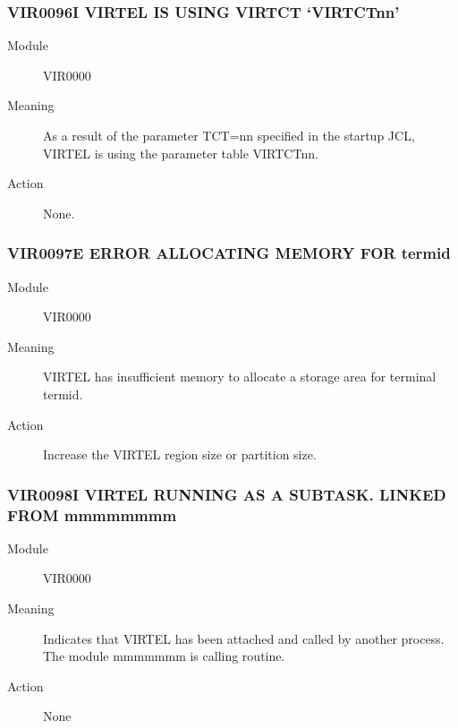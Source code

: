\documentclass[letterpaper,10pt,english]{sphinxmanual}
\begin{document}
\subsubsection{VIR0096I VIRTEL IS USING VIRTCT ‘VIRTCTnn’}
\label{\detokenize{messages:vir0096i-virtel-is-using-virtct-virtctnn}}\begin{description}
\item[{Module}] \leavevmode
VIR0000

\item[{Meaning}] \leavevmode
As a result of the parameter TCT=nn specified in the startup JCL, VIRTEL is using the parameter table VIRTCTnn.

\item[{Action}] \leavevmode
None.

\end{description}


\subsubsection{VIR0097E ERROR ALLOCATING MEMORY FOR termid}
\label{\detokenize{messages:vir0097e-error-allocating-memory-for-termid}}\begin{description}
\item[{Module}] \leavevmode
VIR0000

\item[{Meaning}] \leavevmode
VIRTEL has insufficient memory to allocate a storage area for terminal termid.

\item[{Action}] \leavevmode
Increase the VIRTEL region size or partition size.

\end{description}


\subsubsection{VIR0098I VIRTEL RUNNING AS A SUBTASK. LINKED FROM mmmmmmmm}
\label{\detokenize{messages:vir0098i-virtel-running-as-a-subtask-linked-from-mmmmmmmm}}\begin{description}
\item[{Module}] \leavevmode
VIR0000

\item[{Meaning}] \leavevmode
Indicates that VIRTEL has been attached and called by another process. The module mmmmmmm is calling routine.

\item[{Action}] \leavevmode
None

\end{description}
\end{document}
